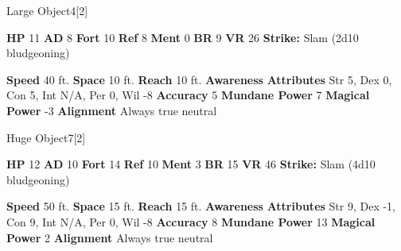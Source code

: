   

  \begin{monsubsection}{Large Object}{4}[2]
    \vspace{-1em}\vspace{-1em}
    \vspace{0em}

    
    

    \begin{spellcontent}
      \begin{spelltargetinginfo}
        \pari \textbf{HP} 11 \monsep
          \textbf{AD} 8 \monsep
          \textbf{Fort} 10 \monsep
          \textbf{Ref} 8 \monsep
          \textbf{Ment} 0
        \pari \textbf{BR} 9 \monsep
        \textbf{VR} 26
        \pari \textbf{Strike:}
            Slam  (2d10 bludgeoning)
      \end{spelltargetinginfo}
    \end{spellcontent}
    \begin{monsterfooter}
      \pari \textbf{Speed} 40 ft. \monsep
        \textbf{Space} 10 ft. \monsep
        \textbf{Reach} 10 ft.
      \pari \textbf{Awareness} 
      \pari \textbf{Attributes}
        Str 5, Dex 0,
        Con 5, Int N/A,
        Per 0, Wil -8
      \pari \textbf{Accuracy} 5 \monsep
        \textbf{Mundane Power} 7 \monsep
      \textbf{Magical Power} -3
      \pari \textbf{Alignment} Always true neutral
    \end{monsterfooter}
  \end{monsubsection}
  
  

  \begin{monsubsection}{Huge Object}{7}[2]
    \vspace{-1em}\vspace{-1em}
    \vspace{0em}

    
    

    \begin{spellcontent}
      \begin{spelltargetinginfo}
        \pari \textbf{HP} 12 \monsep
          \textbf{AD} 10 \monsep
          \textbf{Fort} 14 \monsep
          \textbf{Ref} 10 \monsep
          \textbf{Ment} 3
        \pari \textbf{BR} 15 \monsep
        \textbf{VR} 46
        \pari \textbf{Strike:}
            Slam  (4d10 bludgeoning)
      \end{spelltargetinginfo}
    \end{spellcontent}
    \begin{monsterfooter}
      \pari \textbf{Speed} 50 ft. \monsep
        \textbf{Space} 15 ft. \monsep
        \textbf{Reach} 15 ft.
      \pari \textbf{Awareness} 
      \pari \textbf{Attributes}
        Str 9, Dex -1,
        Con 9, Int N/A,
        Per 0, Wil -8
      \pari \textbf{Accuracy} 8 \monsep
        \textbf{Mundane Power} 13 \monsep
      \textbf{Magical Power} 2
      \pari \textbf{Alignment} Always true neutral
    \end{monsterfooter}
  \end{monsubsection}
  
